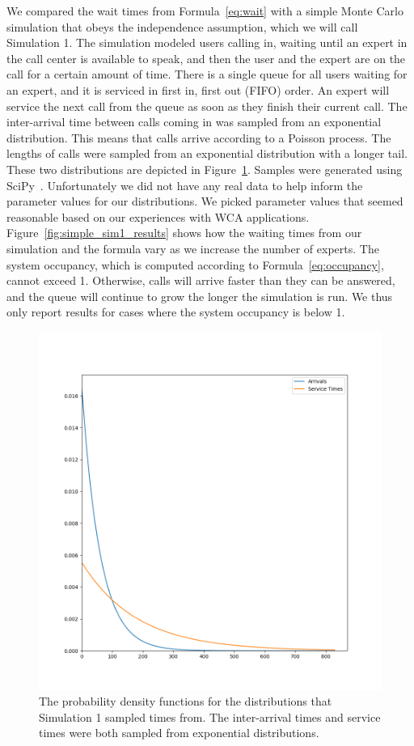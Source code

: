 We compared the wait times from Formula~\ref{eq:wait} with a simple Monte Carlo
simulation that obeys the independence assumption, which we will call Simulation
1.
The simulation modeled users calling in, waiting until an expert in the
call center is available to speak, and then the user and the expert are on the
call for a certain amount of time.
There is a single queue for all users waiting for an expert, and it is serviced
in first in, first out (FIFO) order.
An expert will service the next call from the queue as soon as they finish their
current call.
The inter-arrival time between calls coming in was sampled from an exponential
distribution.
This means that calls arrive according to a Poisson process.
The lengths of calls were sampled from an exponential distribution with a longer
tail.
These two distributions are depicted in Figure~\ref{fig:simple_sim1_dists}.
Samples were generated using SciPy~\cite{scipy}.
Unfortunately we did not have any real data to help inform the parameter values
for our distributions.
We picked parameter values that seemed reasonable based on our experiences with
WCA applications.
Figure~\ref{fig:simple_sim1_results} shows how the waiting times from our
simulation and the formula vary as we increase the number of experts.
The system occupancy, which is computed according to Formula~\ref{eq:occupancy},
cannot exceed 1.
Otherwise, calls will arrive faster than they can be answered, and the queue
will continue to grow the longer the simulation is run.
We thus only report results for cases where the system occupancy is below 1.

\begin{figure}[h]
  \includegraphics[width=\textwidth]{figures/montecarlo/expon_expon.png}
  \caption{
    The probability density functions for the distributions that Simulation 1
    sampled times from.
    The inter-arrival times and service times were both sampled from
    exponential distributions.
  }\label{fig:simple_sim1_dists}
\end{figure}

